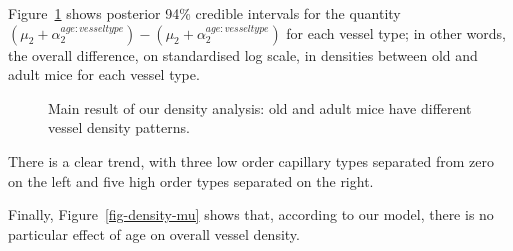 \documentclass[
  letterpaper,
  DIV=11,
  numbers=noendperiod,
  oneside]{scrartcl}
\theoremstyle{plain}
\theoremstyle{remark}
\begin{document}
Figure~\ref{fig-density-effects-detail} shows posterior 94\% credible
intervals for the quantity
\((\mu_2 + \alpha^{age:vessel type}_2) - (\mu_2 + \alpha^{age:vessel
type}_2)\) for each vessel type; in other words, the overall difference,
on standardised log scale, in densities between old and adult mice for
each vessel type.

\begin{figure}


\caption{\label{fig-density-effects-detail}Main result of our density
analysis: old and adult mice have different vessel density patterns.}

\end{figure}%

There is a clear trend, with three low order capillary types separated
from zero on the left and five high order types separated on the right.

Finally, Figure~\ref{fig-density-mu} shows that, according to our model,
there is no particular effect of age on overall vessel density.
\end{document}
